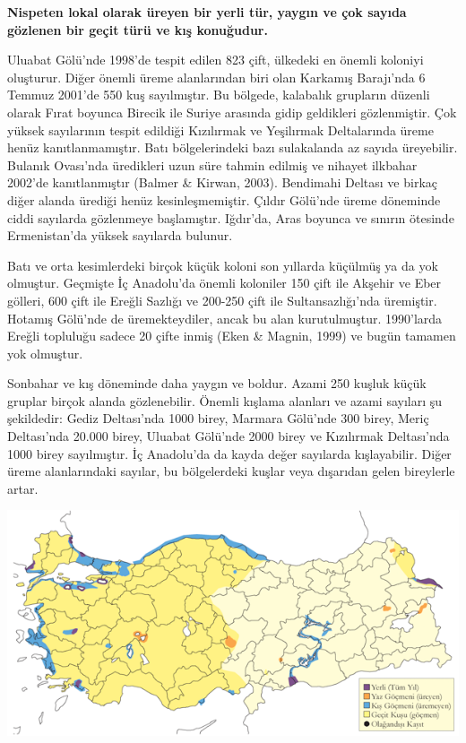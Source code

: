 \documentclass[
  a4paper,
  DIV=11,
  numbers=noendperiod]{scrreprt}
\begin{document}
\textbf{Nispeten lokal olarak üreyen bir yerli tür, yaygın ve çok sayıda
gözlenen bir geçit türü ve kış konuğudur.}

Uluabat Gölü'nde 1998'de tespit edilen 823 çift, ülkedeki en önemli
koloniyi oluşturur. Diğer önemli üreme alanlarından biri olan Karkamış
Barajı'nda 6 Temmuz 2001'de 550 kuş sayılmıştır. Bu bölgede, kalabalık
grupların düzenli olarak Fırat boyunca Birecik ile Suriye arasında gidip
geldikleri gözlenmiştir. Çok yüksek sayılarının tespit edildiği
Kızılırmak ve Yeşilırmak Deltalarında üreme henüz kanıtlanmamıştır. Batı
bölgelerindeki bazı sulakalanda az sayıda üreyebilir. Bulanık Ovası'nda
üredikleri uzun süre tahmin edilmiş ve nihayet ilkbahar 2002'de
kanıtlanmıştır (Balmer \& Kirwan, 2003). Bendimahi Deltası ve birkaç
diğer alanda ürediği henüz kesinleşmemiştir. Çıldır Gölü'nde üreme
döneminde ciddi sayılarda gözlenmeye başlamıştır. Iğdır'da, Aras boyunca
ve sınırın ötesinde Ermenistan'da yüksek sayılarda bulunur.

Batı ve orta kesimlerdeki birçok küçük koloni son yıllarda küçülmüş ya
da yok olmuştur. Geçmişte İç Anadolu'da önemli koloniler 150 çift ile
Akşehir ve Eber gölleri, 600 çift ile Ereğli Sazlığı ve 200-250 çift ile
Sultansazlığı'nda üremiştir. Hotamış Gölü'nde de üremekteydiler, ancak
bu alan kurutulmuştur. 1990'larda Ereğli topluluğu sadece 20 çifte inmiş
(Eken \& Magnin, 1999) ve bugün tamamen yok olmuştur.

Sonbahar ve kış döneminde daha yaygın ve boldur. Azami 250 kuşluk küçük
gruplar birçok alanda gözlenebilir. Önemli kışlama alanları ve azami
sayıları şu şekildedir: Gediz Deltası'nda 1000 birey, Marmara Gölü'nde
300 birey, Meriç Deltası'nda 20.000 birey, Uluabat Gölü'nde 2000 birey
ve Kızılırmak Deltası'nda 1000 birey sayılmıştır. İç Anadolu'da da kayda
değer sayılarda kışlayabilir. Diğer üreme alanlarındaki sayılar, bu
bölgelerdeki kuşlar veya dışarıdan gelen bireylerle artar.

\includegraphics{images/harita_Page_077.png}
\end{document}
